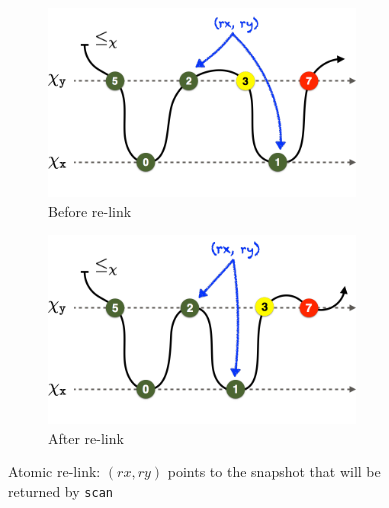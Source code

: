 \begin{figure}
\begin{subfigure}[t]{0.48\textwidth}
\includegraphics[height=5cm]{res/before-relink-trans}
\caption{\label{fig:relink:before} Before re-link}
\end{subfigure} \hfill
\begin{subfigure}[t]{0.48\textwidth}
\includegraphics[height=5cm]{res/after-relink-trans}
\caption{\label{fig:relink:after} After re-link}
\end{subfigure}%
%
\caption{\label{fig:relink} Atomic re-link: $(rx,ry)$ points to the
  snapshot that will be returned by {\tt scan}}
\end{figure}



